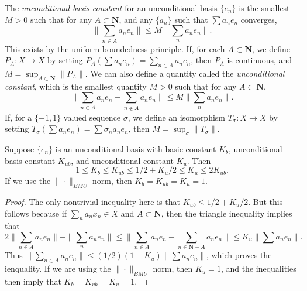 The \emph{unconditional basis constant} for an unconditional basis $\{ e_n \}$ is the smallest $M > 0$ such that for any $A \subset \mathbf{N}$, and any $\{ a_n \}$ such that $\sum a_n e_n$ converges,
%
\[ \| \sum_{n \in A} a_n e_n \| \leq M \| \sum_n a_n e_n \|. \]
%
This exists by the uniform boundedness principle. If, for each $A \subset \mathbf{N}$, we define $P_A: X \to X$ by setting $P_A(\sum a_n e_n) = \sum_{n \in A} a_n e_n$, then $P_A$ is continuous, and $M = \sup_{A \subset \mathbf{N}} \| P_A \|$. We can also define a quantity called the \emph{unconditional constant}, which is the smallest quantity $M > 0$ such that for any $A \subset \mathbf{N}$,
%
\[ \| \sum_{n \in A} a_n e_n - \sum_{n \not \in A} a_n e_n \| \leq M \| \sum_n a_n e_n \|. \]
%
If, for a $\{ -1, 1 \}$ valued sequence $\sigma$, we define an isomorphism $T_\sigma: X \to X$ by setting $T_\sigma(\sum a_n e_n) = \sum \sigma_n a_n e_n$, then $M = \sup_\sigma \| T_\sigma \|$.

\begin{theorem}
    Suppose $\{ e_n \}$ is an unconditional basis with basic constant $K_b$, unconditional basis constant $K_{ub}$, and unconditional constant $K_u$. Then
    \[ 1 \leq K_b \leq K_{ub} \leq 1/2 + K_u/2 \leq K_u \leq 2 K_{ub}. \]
    If we use the $\| \cdot \|_{BMU}$ norm, then $K_b = K_{ub} = K_u = 1$.
\end{theorem}
\begin{proof}
    The only nontrivial inequality here is that $K_{ub} \leq 1/2 + K_u/2$. But this follows because if $\sum_n a_n x_n \in X$ and $A \subset \mathbf{N}$, then the triangle inequality implies that
    \[ 2 \| \sum_{n \in A} a_n e_n \| - \| \sum_n a_n e_n \| \leq \| \sum_{n \in A} a_n e_n - \sum_{n \in \mathbf{N} - A} a_n e_n \| \leq K_u \| \sum a_n e_n \|. \]
    Thus $\| \sum_{n \in A} a_n e_n \| \leq (1/2)(1 + K_u) \| \sum a_n e_n \|$, which proves the ienquality. If we are using the $\| \cdot \|_{BMU}$ norm, then $K_u = 1$, and the inequalities then imply that $K_b = K_{ub} = K_u = 1$.
\end{proof}


